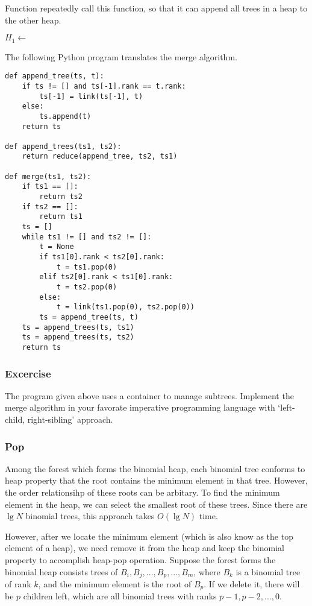\documentclass{article}
\begin{document}
Function  repeatedly call this function, so 
that it can append all trees in a heap to the other heap.

\begin{algorithmic}
    \State $H_1 \gets $ 
  \EndFor
\EndFunction
\end{algorithmic}

The following Python program translates the merge algorithm.

\lstset{language=Python}
\begin{lstlisting}
def append_tree(ts, t):
    if ts != [] and ts[-1].rank == t.rank:
        ts[-1] = link(ts[-1], t)
    else:
        ts.append(t)
    return ts

def append_trees(ts1, ts2):
    return reduce(append_tree, ts2, ts1)

def merge(ts1, ts2):
    if ts1 == []:
        return ts2
    if ts2 == []:
        return ts1
    ts = []
    while ts1 != [] and ts2 != []:
        t = None
        if ts1[0].rank < ts2[0].rank:
            t = ts1.pop(0)
        elif ts2[0].rank < ts1[0].rank:
            t = ts2.pop(0)
        else:
            t = link(ts1.pop(0), ts2.pop(0))
        ts = append_tree(ts, t)
    ts = append_trees(ts, ts1)
    ts = append_trees(ts, ts2)
    return ts
\end{lstlisting}

\subsubsection*{Excercise}

The program given above uses a container to manage subtrees.
Implement the merge algorithm in your favorate imperative programming
language with `left-child, right-sibling' approach.

\subsubsection{Pop}
Among the forest which forms the binomial heap, each binomial tree 
conforms to heap property that the root contains the minimum element 
in that tree. However, the order relationsihp of these roots can be
arbitary. To find the minimum element in the heap, we can select the 
smallest root of these trees. Since there are $\lg N$ binomial trees, 
this approach takes $O(\lg N)$ time.

However, after we locate the minimum element (which is also know as 
the top element of a heap), we need remove it from the heap and keep
the binomial property to accomplish heap-pop operation.
Suppose the forest forms the binomial heap consists trees of 
$B_i, B_j, ..., B_p, ..., B_m$, where $B_k$ is a binomial tree of
rank $k$, and the minimum element is the root of $B_p$. If we 
delete it, there will be $p$ children left, which are all
binomial trees with ranks $p-1, p-2, ..., 0$.
\end{document}
